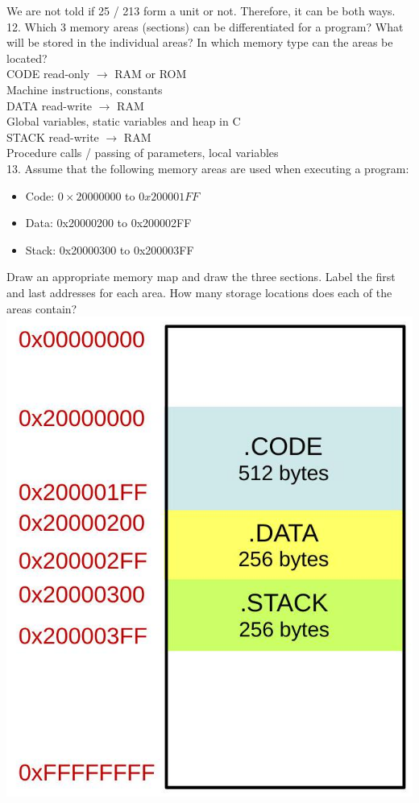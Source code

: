 \documentclass[10pt]{article}
\begin{document}
We are not told if 25 / 213 form a unit or not. Therefore, it can be both ways.\\
12. Which 3 memory areas (sections) can be differentiated for a program? What will be stored in the individual areas? In which memory type can the areas be located?\\
CODE read-only $\rightarrow$ RAM or ROM\\
Machine instructions, constants\\
DATA read-write $\rightarrow$ RAM\\
Global variables, static variables and heap in C\\
STACK read-write $\rightarrow$ RAM\\
Procedure calls / passing of parameters, local variables\\
13. Assume that the following memory areas are used when executing a program:

\begin{itemize}
  \item Code: $0 \times 20000000$ to $0 x 200001 F F$
  \item Data: 0x20000200 to 0x200002FF
  \item Stack: 0x20000300 to 0x200003FF
\end{itemize}

Draw an appropriate memory map and draw the three sections. Label the first and last addresses for each area. How many storage locations does each of the areas contain?\\
\includegraphics[max width=\textwidth, center]{2025_01_02_5d04f07cd96c1366bf1bg-5}
\end{document}
